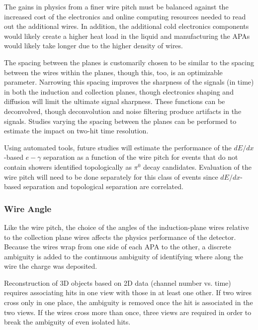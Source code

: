 The gains in physics from a finer wire pitch must be balanced against
the increased cost of the electronics and online computing resources
needed to read out the additional wires.  In addition, the additional
cold electronics components would likely create a higher heat load in
the liquid and manufacturing the APAs would likely take longer due to
the higher density of wires.

The spacing between the planes is customarily chosen to be similar to
the spacing between the wires within the planes, though this, too, is
an optimizable parameter.  Narrowing this spacing improves the
sharpness of the signals (in time) in both the induction and
collection planes, though electronics shaping and diffusion will limit
the ultimate signal sharpness.  These functions can be deconvolved,
though deconvolution and noise filtering produce artifacts in the
signals.  Studies varying the spacing between the planes can be
performed to estimate the impact on two-hit time resolution.

Using automated tools, future studies will estimate the performance of the 
$dE/dx$-based $e-\gamma$ separation as a function of the wire pitch for 
events that do not contain showers identified topologically as $\pi^0$ decay 
candidates. Evaluation of the wire pitch will need to be done separately for 
this class of events since $dE/dx$-based separation and topological separation 
are correlated.

\subsubsection{Wire Angle}
\label{v4:fd-ref-wireangle}

Like the wire pitch, the choice of the angles of the induction-plane
wires relative to the collection plane wires affects the physics
performance of the detector.  Because the wires wrap from one side of
each APA to the other, a discrete ambiguity is added to the
continuous ambiguity of identifying where along the wire the charge was deposited.

Reconstruction of 3D objects based on 2D data (channel number
vs. time) requires associating hits in one view with those in at least
one other.  If two wires cross only in one place, the ambiguity is
removed once the hit is associated in the two views.  If the wires
cross more than once, three views are required in order to break the
ambiguity of even isolated hits.

